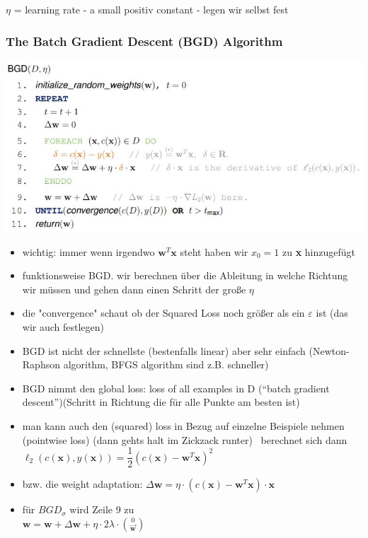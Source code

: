 \documentclass[11pt,a4paper]{article}
\begin{document}
\begin{flushleft}
$\eta$ = learning rate - a small positiv constant - legen wir selbst fest

\subsubsection{The Batch Gradient Descent (BGD) Algorithm}
\includegraphics[width=\textwidth]{BGD}
\begin{itemize}
\item wichtig: immer wenn irgendwo $\textbf{w}^T\textbf{x}$ steht haben wir $x_0 = 1$ zu \textbf{x} hinzugefügt
\item funktionsweise BGD. wir berechnen über die Ableitung in welche Richtung wir müssen und gehen dann einen Schritt der große $\eta$
\item die "convergence" schaut ob der Squared Loss noch größer als ein $\varepsilon$ ist (das wir auch festlegen)
\item BGD ist nicht der schnellste (bestenfalls linear) aber sehr einfach (Newton-Raphson algorithm, BFGS algorithm sind z.B. schneller)
\item BGD nimmt den global loss: loss of all examples in D (“batch gradient descent”)(Schritt in Richtung die für alle Punkte am besten ist)
\item man kann auch den (squared) loss in Bezug auf einzelne Beispiele nehmen (pointwise loss) (dann gehts halt im Zickzack runter)
\ berechnet sich dann $\ell_2(c(\textbf{x}), y(\textbf{x})) = \dfrac{1}{2} (c(\textbf{x})- \textbf{w}^T\textbf{x})^2$
\item bzw. die weight adaptation: $ \Delta\textbf{w} = \eta \cdot (c(\textbf{x}) - \textbf{w}^T \textbf{x}) \cdot \textbf{x} $
\item für $BGD_\sigma$ wird Zeile 9 zu  \\ $\textbf{w} = \textbf{w} + \Delta \textbf{w} + \eta \cdot 2 \lambda \cdot \binom{0}{\overrightarrow{\textbf{w}}}$
\end{itemize}

\end{flushleft}
\end{document}
